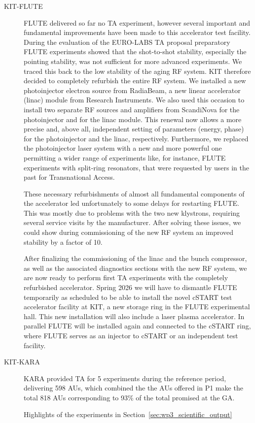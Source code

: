 \begin{description}
  
\item[KIT-FLUTE] FLUTE delivered so far no TA experiment, however several important and fundamental improvements have been made to this accelerator test facility. During the evaluation of the EURO-LABS TA proposal preparatory FLUTE experiments showed that the shot-to-shot stability, especially the pointing stability, was not sufficient for more advanced experiments. We traced this back to the low stability of the aging RF system. KIT therefore decided to completely refurbish the entire RF system. We installed a new photoinjector electron source from RadiaBeam, a new linear accelerator (linac) module from Research Instruments. We also used this occasion to install two separate RF sources and amplifiers from ScandiNova for the photoinjector and for the linac module. This renewal now allows a more precise and, above all, independent setting of parameters (energy, phase) for the photoinjector and the linac, respectively. Furthermore, we replaced the photoinjector laser system with a new and more powerful one permitting a wider range of experiments like, for instance, FLUTE experiments with split-ring resonators, that were requested by users in the past for Transnational Access.

These necessary refurbishments of almost all fundamental components of the accelerator led unfortunately to some delays for restarting FLUTE. This was mostly due to problems with the two new klystrons, requiring several service visits by the manufacturer. After solving these issues, we could show during commissioning of the new RF system an improved stability by a factor of 10.

After finalizing the commissioning of the linac and the bunch compressor, as well as the associated diagnostics sections with the new RF system, we are now ready to perform first TA experiments with the completely refurbished accelerator. 
Spring 2026 we will have to dismantle FLUTE temporarily as scheduled to be able to install the novel cSTART test accelerator facility at KIT, a new storage ring in the FLUTE experimental hall. This new installation will also include a laser plasma accelerator. In parallel FLUTE will be installed again and connected to the cSTART ring, where FLUTE serves as an injector to cSTART or an independent test facility.

\item[KIT-KARA]

KARA provided TA for 5 experiments during the reference period, delivering 598 AUs, which combined the the AUs offered in P1 make the total 818 AUs corresponding to 93\% of the total promised at the GA. 

Highlights of the experiments in Section~\ref{sec:wp3_scientific_output}
\end{description}

